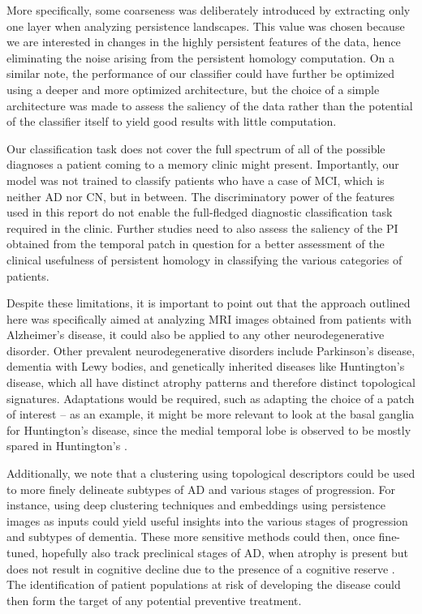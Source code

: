 \documentclass{article}
\begin{document}
More specifically, some coarseness was deliberately introduced by extracting only one layer when
analyzing persistence landscapes. This value was chosen because we are interested in changes in the
highly persistent features of the data, hence eliminating the noise arising from the persistent
homology computation. On a similar note, the performance of our classifier could have further be
optimized using a deeper and more optimized architecture, but the choice of a simple architecture
was made to assess the saliency of the data rather than the potential of the classifier itself to
yield good results with little computation.

Our classification task does not cover the full spectrum of all of the possible diagnoses a patient
coming to a memory clinic might present. Importantly, our model was not trained to classify patients
who have a case of MCI, which is neither AD nor CN, but in between. The
discriminatory power of the features used in this report do not enable the full-fledged
diagnostic classification task required in the clinic. Further studies need to also assess the
saliency of the PI obtained from the temporal patch in question for a better assessment of the
clinical usefulness of persistent homology in classifying the various categories of patients.

Despite these limitations, it is important to point out that the approach outlined here was
specifically aimed at analyzing MRI images obtained from patients with Alzheimer's disease, it could
also be applied to any other neurodegenerative disorder. Other prevalent neurodegenerative disorders
include Parkinson's disease, dementia with Lewy bodies, and genetically inherited diseases like
Huntington's disease, which all have distinct atrophy patterns and therefore distinct topological signatures.
Adaptations would be required, such as adapting the choice of a patch of interest -- as an example, it
might be more relevant to look at the basal ganglia for Huntington's disease, since the medial
temporal lobe is observed to be mostly spared in Huntington's
\citep{kuhl1982cerebral, halliday1998regional, kassubek2004topography}.

Additionally, we note that a clustering using topological descriptors could be used to more finely
delineate subtypes of AD and various stages of progression. For instance, using deep clustering
techniques and embeddings using persistence images as inputs could yield useful insights into the
various stages of progression and subtypes of dementia. These more sensitive methods could then,
once fine-tuned, hopefully also track preclinical stages of AD, when atrophy is present but does not
result in cognitive decline due to the presence of a cognitive reserve
\citep{scarmeas2004cognitive, van2017neuroimaging}. The identification of patient populations at
risk of developing the disease could then form the target of any potential preventive treatment.
\end{document}
